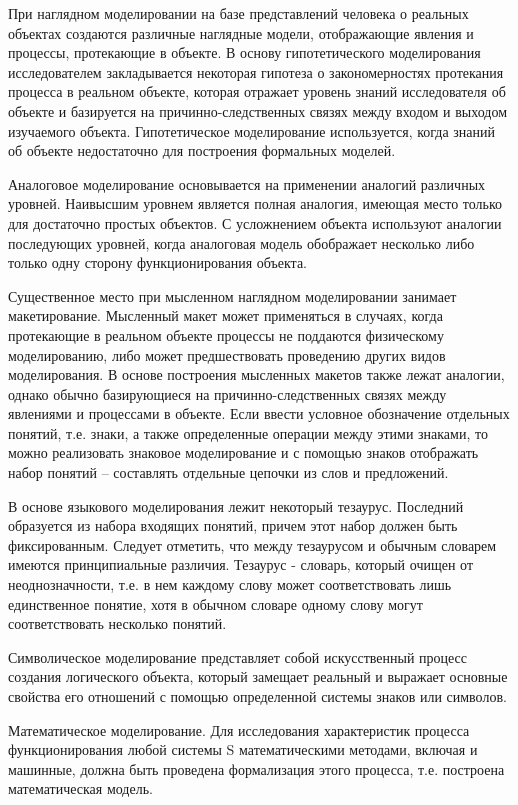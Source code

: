 \documentclass{article}
\begin{document}
    При наглядном моделировании на базе представлений человека о реальных объектах создаются различные наглядные модели, отображающие явления и процессы, протекающие в объекте. В основу гипотетического моделирования исследователем закладывается некоторая гипотеза о закономерностях протекания процесса в реальном объекте, которая отражает уровень знаний исследователя об объекте и базируется на причинно-следственных связях между входом и выходом изучаемого объекта. Гипотетическое моделирование используется, когда знаний об объекте недостаточно для построения формальных моделей.

    Аналоговое моделирование основывается на применении аналогий различных уровней. Наивысшим уровнем является полная аналогия, имеющая место только для достаточно простых объектов. С усложнением объекта используют аналогии последующих уровней, когда аналоговая модель обображает несколько либо только одну сторону функционирования объекта.

    Существенное место при мысленном наглядном моделировании занимает макетирование. Мысленный макет может применяться в случаях, когда протекающие в реальном объекте процессы не поддаются физическому моделированию, либо может предшествовать проведению других видов моделирования. В основе построения мысленных макетов также лежат аналогии, однако обычно базирующиеся на причинно-следственных связях между явлениями и процессами в объекте. Если ввести условное обозначение отдельных понятий, т.е. знаки, а также определенные операции между этими знаками, то можно реализовать знаковое моделирование и с помощью знаков отображать набор понятий -- составлять отдельные цепочки из слов и предложений.

    В основе языкового моделирования лежит некоторый тезаурус. Последний образуется из набора входящих понятий, причем этот набор должен быть фиксированным. Следует отметить, что между тезаурусом и обычным словарем имеются принципиальные различия. Тезаурус - словарь, который очищен от неоднозначности, т.е. в нем каждому слову может соответствовать лишь единственное понятие, хотя в обычном словаре одному слову могут соответствовать несколько понятий.

    Символическое моделирование представляет собой искусственный процесс создания логического объекта, который замещает реальный и выражает основные свойства его отношений с помощью определенной системы знаков или символов.

    Математическое моделирование. Для исследования характеристик процесса функционирования любой системы S математическими методами, включая и машинные, должна быть проведена формализация этого процесса, т.е. построена математическая модель.
\end{document}
